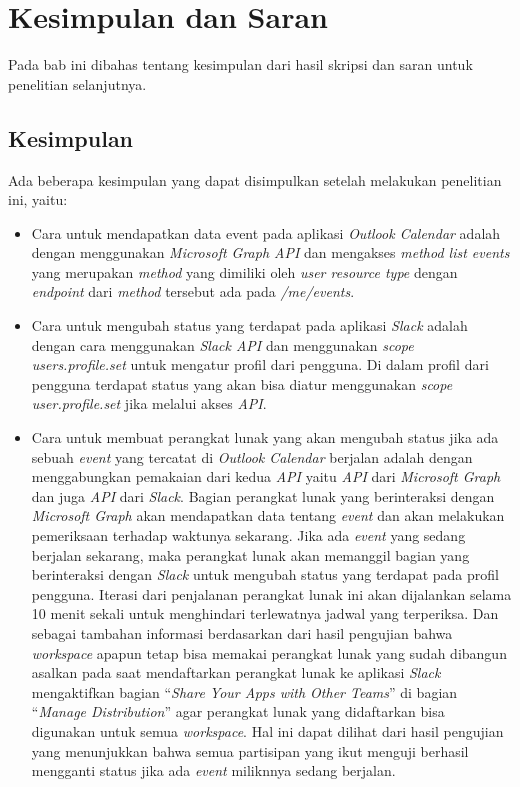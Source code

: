 \chapter{Kesimpulan dan Saran}
\label{chap:kesimpulan dan saran}

Pada bab ini dibahas tentang kesimpulan dari hasil skripsi dan saran untuk penelitian selanjutnya. 

\section{Kesimpulan}
Ada beberapa kesimpulan yang dapat disimpulkan setelah melakukan penelitian ini, yaitu:
\begin{itemize}
    \item Cara untuk mendapatkan data event pada aplikasi \textit{Outlook Calendar} adalah dengan menggunakan \textit{Microsoft Graph API} dan mengakses \textit{method list events} yang merupakan \textit{method} yang dimiliki oleh \textit{user resource type} dengan \textit{endpoint} dari \textit{method} tersebut ada pada \textit{/me/events}. 
    \item Cara untuk mengubah status yang terdapat pada aplikasi \textit{Slack} adalah dengan cara menggunakan \textit{Slack API} dan menggunakan \textit{scope users.profile.set} untuk mengatur profil dari pengguna. Di dalam profil dari pengguna terdapat status yang akan bisa diatur menggunakan \textit{scope user.profile.set} jika melalui akses \textit{API}. 
    \item Cara untuk membuat perangkat lunak yang akan mengubah status jika ada sebuah \textit{event} yang tercatat di \textit{Outlook Calendar} berjalan adalah dengan menggabungkan pemakaian dari kedua \textit{API} yaitu \textit{API} dari \textit{Microsoft Graph} dan juga \textit{API} dari \textit{Slack}. Bagian perangkat lunak yang berinteraksi dengan \textit{Microsoft Graph} akan mendapatkan data tentang \textit{event} dan akan melakukan pemeriksaan terhadap waktunya sekarang. Jika ada \textit{event} yang sedang berjalan sekarang, maka perangkat lunak akan memanggil bagian yang berinteraksi dengan \textit{Slack} untuk mengubah status yang terdapat pada profil pengguna. Iterasi dari penjalanan perangkat lunak ini akan dijalankan selama 10 menit sekali untuk menghindari terlewatnya jadwal yang terperiksa. Dan sebagai tambahan informasi berdasarkan dari hasil pengujian bahwa \textit{workspace} apapun tetap bisa memakai perangkat lunak yang sudah dibangun asalkan pada saat mendaftarkan perangkat lunak ke aplikasi \textit{Slack} mengaktifkan bagian ``\textit{Share Your Apps with Other Teams}'' di bagian ``\textit{Manage Distribution}'' agar perangkat lunak yang didaftarkan bisa digunakan untuk semua \textit{workspace}. Hal ini dapat dilihat dari hasil pengujian yang menunjukkan bahwa semua partisipan yang ikut menguji berhasil mengganti status jika ada \textit{event} miliknnya sedang berjalan. 
\end{itemize}
